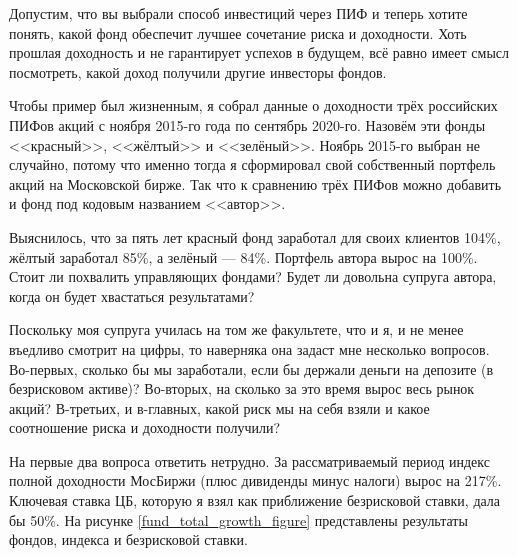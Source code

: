 Допустим, что вы выбрали способ инвестиций через ПИФ и теперь хотите понять, 
какой фонд обеспечит лучшее сочетание риска и доходности. Хоть прошлая 
доходность и не гарантирует успехов в будущем, всё равно имеет смысл посмотреть, 
какой доход получили другие инвесторы фондов.

Чтобы пример был жизненным, я собрал данные о доходности трёх российских ПИФов 
акций с ноября 2015-го года по сентябрь 2020-го. Назовём эти фонды <<красный>>, 
<<жёлтый>> и <<зелёный>>. Ноябрь 2015-го выбран не случайно, потому что именно 
тогда я сформировал свой собственный портфель акций на Московской бирже. Так что 
к сравнению трёх ПИФов можно добавить и фонд под кодовым названием <<автор>>.

Выяснилось, что за пять лет красный фонд заработал для своих клиентов 104\%, 
жёлтый заработал 85\%, а зелёный --- 84\%. Портфель автора вырос на 100\%. Стоит 
ли похвалить управляющих фондами? Будет ли довольна супруга автора, когда он 
будет хвастаться результатами?

Поскольку моя супруга училась на том же факультете, что и я, и не менее въедливо 
смотрит на цифры, то наверняка она задаст мне несколько вопросов. Во-первых, 
сколько бы мы заработали, если бы держали деньги на депозите (в безрисковом 
активе)? Во-вторых, на сколько за это время вырос весь рынок акций? В-третьих, и 
в-главных, какой риск мы на себя взяли и какое соотношение риска и доходности 
получили?

На первые два вопроса ответить нетрудно. За рассматриваемый период индекс  
полной доходности МосБиржи (плюс дивиденды минус налоги) вырос на 217\%. 
Ключевая ставка ЦБ, которую я взял как приближение безрисковой ставки, дала бы 
50\%. На рисунке \ref{fund_total_growth_figure} представлены результаты фондов, 
индекса и безрисковой ставки.

